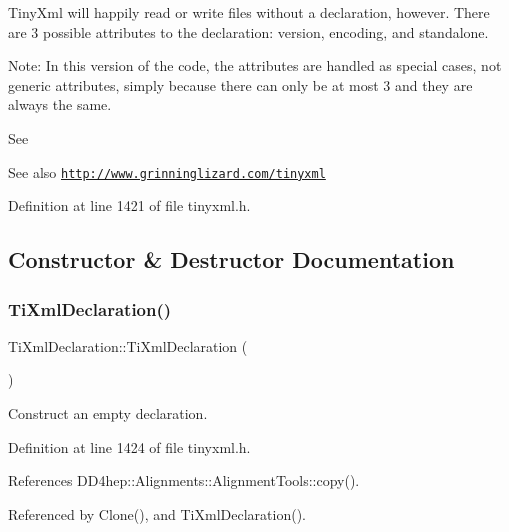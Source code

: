 Tiny\+Xml will happily read or write files without a declaration, however. There are 3 possible attributes to the declaration\+: version, encoding, and standalone.

Note\+: In this version of the code, the attributes are handled as special cases, not generic attributes, simply because there can only be at most 3 and they are always the same.

See \begin{DoxySeeAlso}{See also}
\href{http://www.grinninglizard.com/tinyxml}{\tt http\+://www.\+grinninglizard.\+com/tinyxml} 
\end{DoxySeeAlso}


Definition at line 1421 of file tinyxml.\+h.



\subsection{Constructor \& Destructor Documentation}
\hypertarget{class_ti_xml_declaration_aa0484d059bea0ea1acb47c9094382d79}{}\label{class_ti_xml_declaration_aa0484d059bea0ea1acb47c9094382d79} 
\subsubsection{\texorpdfstring{Ti\+Xml\+Declaration()}{TiXmlDeclaration()}\hspace{0.1cm}{\footnotesize\ttfamily [1/4]}}
{\footnotesize\ttfamily Ti\+Xml\+Declaration\+::\+Ti\+Xml\+Declaration (\begin{DoxyParamCaption}{ }\end{DoxyParamCaption})\hspace{0.3cm}{\ttfamily [inline]}}



Construct an empty declaration. 



Definition at line 1424 of file tinyxml.\+h.



References D\+D4hep\+::\+Alignments\+::\+Alignment\+Tools\+::copy().



Referenced by Clone(), and Ti\+Xml\+Declaration().

\hypertarget{class_ti_xml_declaration_acd5556007c3c72209465081de39d9836}{}\label{class_ti_xml_declaration_acd5556007c3c72209465081de39d9836} 

